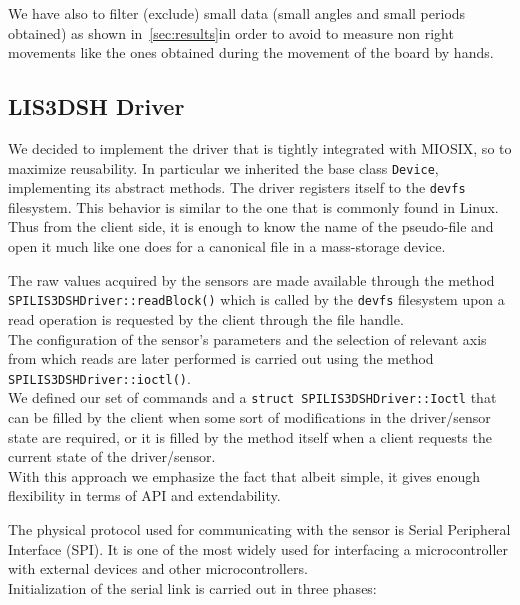 We have also to filter (exclude) small data (small angles and small periods obtained) as shown in~\ref{sec:results}in order  to avoid to measure non right movements like the ones obtained during the movement of the board by hands.

\subsection{LIS3DSH Driver}
We decided to implement the driver that is tightly integrated with MIOSIX, so to maximize reusability. In particular we inherited the base class \texttt{Device}, implementing its abstract methods. The driver registers itself to the \texttt{devfs} filesystem. This behavior is similar to the one that is commonly found in Linux. Thus from the client side, it is enough to know the name of the pseudo-file and open it much like one does for a canonical file in a mass-storage device.  \par The raw values acquired by the sensors are made available through the method \\ \texttt{SPILIS3DSHDriver::readBlock()} which is called by the \texttt{devfs} filesystem upon a read operation is requested by the client through the file handle. \\
The configuration of the sensor's parameters and the selection of relevant axis from which reads are later performed is carried out using the method \texttt{SPILIS3DSHDriver::ioctl()}. \\ We defined our set of commands and a \texttt{struct SPILIS3DSHDriver::Ioctl} that can be filled by the client when some sort of modifications in the driver/sensor state are required, or it is filled by the method itself when a client requests the current state of the driver/sensor. \\ With this approach we emphasize the fact that albeit simple, it gives enough flexibility in terms of API and extendability.
\par
The physical protocol used for communicating with the sensor is Serial Peripheral Interface \cite{accelerometerDatasheet}\cite{STM32F4RefMan}  (SPI). It is one of the most widely used for interfacing a microcontroller with external devices and other microcontrollers. \\  
Initialization of the serial link is carried out in three phases:
